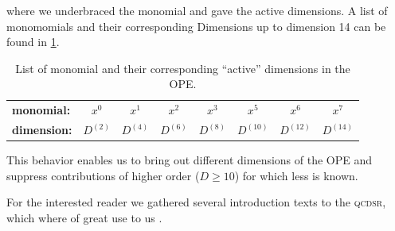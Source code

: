\documentclass[../../index.tex]{subfiles}
\begin{document}
where we underbraced the monomial and gave the active dimensions. A list of
monomomials and their corresponding Dimensions up to dimension 14 can be found
in \cref{table:monomialDimensions}.
\begin{table}
  \centering
  \begin{tabular}{l|ccccccc}
    \toprule
    \textbf{monomial:} & $x^0$ & $x^1$ & $x^2$ & $x^3$ & $x^5$ & $x^6$ & $x^7$\\
    \textbf{dimension:} & $D^{(2)}$ & $D^{(4)}$ & $D^{(6)}$ & $D^{(8)}$ & $D^{(10)}$ & $D^{(12)}$ & $D^{(14)}$\\
    \bottomrule 
  \end{tabular}
  \caption{List of monomial and their corresponding ``active'' dimensions in the
    OPE.}
  \label{table:monomialDimensions}
\end{table}
This behavior enables us to bring out different dimensions of the OPE and
suppress contributions of higher order ($D\geq10$) for which less is known.


For the interested reader we gathered several introduction texts to the
\textsc{qcdsr}, which where of great use to us
\cite{Narison1989,Rafael1997,Colangelo2000,Dominguez2013}.
\end{document}
